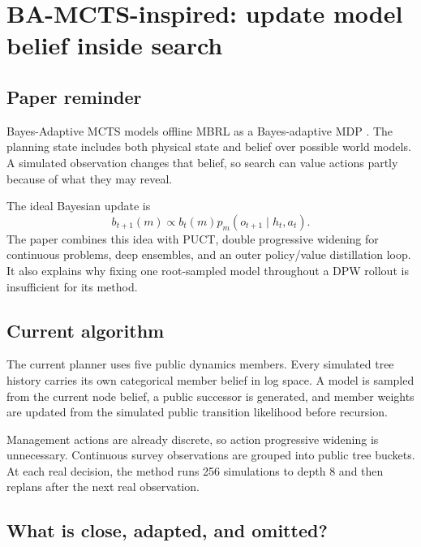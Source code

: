 \documentclass[11pt,a4paper]{article}
\begin{document}
\section{BA-MCTS-inspired: update model belief inside search}

\subsection{Paper reminder}

Bayes-Adaptive MCTS models offline MBRL as a Bayes-adaptive MDP
\cite{bamcts2026}. The planning state includes both physical state and belief over possible world
models. A simulated observation changes that belief, so search can value actions partly because of
what they may reveal.

The ideal Bayesian update is
\[
b_{t+1}(m)\propto b_t(m)
p_m(o_{t+1}\mid h_t,a_t).
\]
The paper combines this idea with PUCT, double progressive widening for continuous problems, deep
ensembles, and an outer policy/value distillation loop. It also explains why fixing one root-sampled
model throughout a DPW rollout is insufficient for its method.

\subsection{Current algorithm}

The current planner uses five public dynamics members. Every simulated tree history carries its
own categorical member belief in log space. A model is sampled from the current node belief, a
public successor is generated, and member weights are updated from the simulated public transition
likelihood before recursion.

Management actions are already discrete, so action progressive widening is unnecessary. Continuous
survey observations are grouped into public tree buckets. At each real decision, the method runs
256 simulations to depth 8 and then replans after the next real observation.

\subsection{What is close, adapted, and omitted?}
\end{document}

